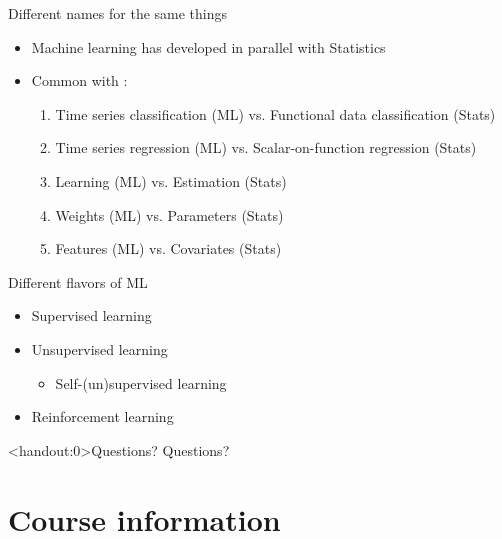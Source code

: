 \documentclass[10pt]{beamer}
\begin{document}
\begin{frame}{Different names for the same things}

\begin{itemize}
\item Machine learning has developed in parallel with Statistics
\item Common with :
\begin{enumerate}
\item Time series classification (ML) vs. Functional data classification (Stats)\pause
\item Time series regression (ML) vs. Scalar-on-function
regression (Stats)\pause
\item Learning (ML) vs. Estimation (Stats)\pause
\item Weights (ML) vs. Parameters (Stats)\pause
\item Features (ML) vs. Covariates (Stats)
\end{enumerate}

\end{itemize}

\end{frame}


\begin{frame}{Different flavors of ML}

\begin{itemize}
\item Supervised learning
\item Unsupervised learning
\begin{itemize}
\item Self-(un)supervised learning
\end{itemize}
\item Reinforcement learning
\end{itemize}

\end{frame}


\begin{frame}<handout:0>{Questions?}
Questions?
\end{frame}


\section{Course information}
\frame{\sectionpage}
\end{document}
